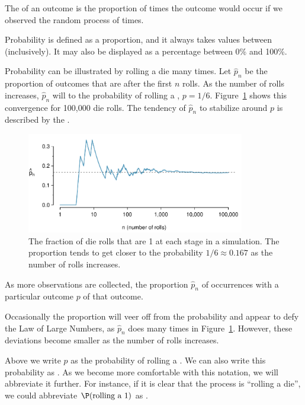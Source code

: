 \documentclass{ccg-topic}
\begin{document}
\begin{defn}[Probability]
    The  of an outcome is the proportion of times the outcome would occur if we observed the random process  of times.
\end{defn}

Probability is defined as a proportion, and it always takes values between  (inclusively). It may also be displayed as a percentage between 0\% and 100\%.

Probability can be illustrated by rolling a die many times. Let $\hat{p}_n$ be the proportion of outcomes that are  after the first $n$ rolls. As the number of rolls increases, $\hat{p}_n$ will  to the probability of rolling a , $p = 1/6$. Figure~\ref{dieProp} shows this convergence for 100,000 die rolls. The tendency of $\hat{p}_n$ to stabilize around $p$ is described by the . 

\begin{figure}[h]
\centering
\includegraphics[width=0.85\textwidth]{ch_probability/figures/dieProp/dieProp}
\caption{The fraction of die rolls that are 1 at each stage in a simulation. The proportion tends to get closer to the probability $1/6 \approx 0.167$ as the number of rolls increases.}
\label{dieProp}
\end{figure}

\begin{defn}
As more observations are collected, the proportion $\hat{p}_n$ of occurrences with a particular outcome  $p$ of that outcome.
\end{defn}

Occasionally the proportion will veer off from the probability and appear to defy the Law of Large Numbers, as $\hat{p}_n$ does many times in Figure~\ref{dieProp}. However, these deviations become smaller as the number of rolls increases.

Above we write $p$ as the probability of rolling a . We can also write this probability as . As we become more comfortable with this notation, we will abbreviate it further. For instance, if it is clear that the process is ``rolling a die'', we could abbreviate $\P(\text{rolling a 1})$ as . 
\end{document}
